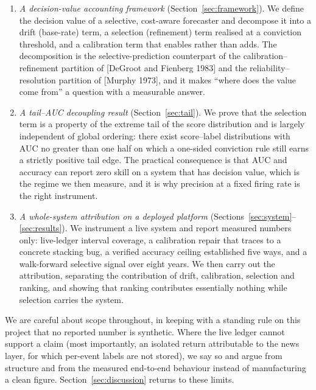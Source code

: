 \documentclass[10pt,a4paper,oneside]{article}
\theoremstyle{definition}
\theoremstyle{plain}
\begin{document}
\begin{enumerate}[leftmargin=1.4em,itemsep=2pt,topsep=2pt]
\item \emph{A decision-value accounting framework} (Section~\ref{sec:framework}).
We define the decision value of a selective, cost-aware forecaster and decompose it
into a drift (base-rate) term, a selection (refinement) term realised at a
conviction threshold, and a calibration term that enables rather than adds. The
decomposition is the selective-prediction counterpart of the calibration--refinement
partition of [DeGroot and Fienberg 1983] and the reliability--resolution partition
of [Murphy 1973], and it makes ``where does the value come from'' a question with a
measurable answer.
\item \emph{A tail--AUC decoupling result} (Section~\ref{sec:tail}). We prove that
the selection term is a property of the extreme tail of the score distribution and
is largely independent of global ordering: there exist score--label distributions
with AUC no greater than one half on which a one-sided conviction rule still earns a
strictly positive tail edge. The practical consequence is that AUC and accuracy can
report zero skill on a system that has decision value, which is the regime we
then measure, and it is why precision at a fixed firing rate is the right instrument.
\item \emph{A whole-system attribution on a deployed platform}
(Sections~\ref{sec:system}--\ref{sec:results}). We instrument a live system and
report measured numbers only: live-ledger interval coverage, a calibration repair
that traces to a concrete stacking bug, a verified accuracy ceiling established five
ways, and a walk-forward selective signal over eight years. We then carry out the
attribution, separating the contribution of drift, calibration, selection and
ranking, and showing that ranking contributes essentially nothing while selection
carries the system.
\end{enumerate}

We are careful about scope throughout, in keeping with a standing
rule on this project that no reported number is synthetic. Where the live ledger
cannot support a claim (most importantly, an isolated return attributable to the
news layer, for which per-event labels are not stored), we say so and argue from
structure and from the measured end-to-end behaviour instead of manufacturing a
clean figure. Section~\ref{sec:discussion} returns to these limits.

\end{document}
